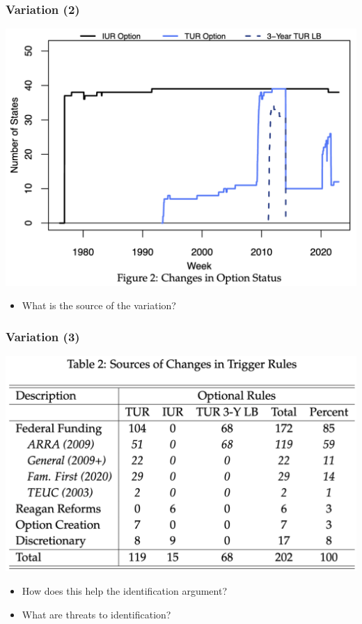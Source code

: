 \documentclass[english,xcolor=svgnames]{beamer}
\begin{document}
\begin{frame}
	\frametitle[alignment=center]{Variation (2)}
	\begin{center}
		\includegraphics[scale=0.3]{figures/AMNSFIG2.png}
	\end{center}
	\begin{itemize}
		\item What is the source of the variation?
	\end{itemize}
\end{frame}

\begin{frame}
	\frametitle[alignment=center]{Variation (3)}
	\begin{center}
		\includegraphics[scale=0.3]{figures/AMNSTAB2.png}
	\end{center}
	\begin{itemize}
		\item How does this help the identification argument?
		\item What are threats to identification?
	\end{itemize}
\end{frame}
\end{document}
